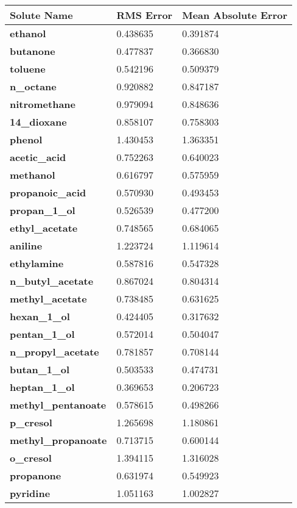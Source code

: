 \documentclass{amsart}
\begin{document}
 
\begin{center}
\begin{tabular}{|l|l|l|} 
\hline  
\textbf{Solute Name}&\textbf{RMS Error}&\textbf{Mean Absolute Error} \\ \hline
\hline 
\textbf{ethanol}&0.438635&0.391874 \\ \hline 
\textbf{butanone}&0.477837&0.366830 \\ \hline 
\textbf{toluene}&0.542196&0.509379 \\ \hline 
\textbf{n\_octane}&0.920882&0.847187 \\ \hline 
\textbf{nitromethane}&0.979094&0.848636 \\ \hline 
\textbf{14\_dioxane}&0.858107&0.758303 \\ \hline 
\textbf{phenol}&1.430453&1.363351 \\ \hline 
\textbf{acetic\_acid}&0.752263&0.640023 \\ \hline 
\textbf{methanol}&0.616797&0.575959 \\ \hline 
\textbf{propanoic\_acid}&0.570930&0.493453 \\ \hline 
\textbf{propan\_1\_ol}&0.526539&0.477200 \\ \hline 
\textbf{ethyl\_acetate}&0.748565&0.684065 \\ \hline 
\textbf{aniline}&1.223724&1.119614 \\ \hline 
\textbf{ethylamine}&0.587816&0.547328 \\ \hline 
\textbf{n\_butyl\_acetate}&0.867024&0.804314 \\ \hline 
\textbf{methyl\_acetate}&0.738485&0.631625 \\ \hline 
\textbf{hexan\_1\_ol}&0.424405&0.317632 \\ \hline 
\textbf{pentan\_1\_ol}&0.572014&0.504047 \\ \hline 
\textbf{n\_propyl\_acetate}&0.781857&0.708144 \\ \hline 
\textbf{butan\_1\_ol}&0.503533&0.474731 \\ \hline 
\textbf{heptan\_1\_ol}&0.369653&0.206723 \\ \hline 
\textbf{methyl\_pentanoate}&0.578615&0.498266 \\ \hline 
\textbf{p\_cresol}&1.265698&1.180861 \\ \hline 
\textbf{methyl\_propanoate}&0.713715&0.600144 \\ \hline 
\textbf{o\_cresol}&1.394115&1.316028 \\ \hline 
\textbf{propanone}&0.631974&0.549923 \\ \hline 
\textbf{pyridine}&1.051163&1.002827 \\ \hline 
\end{tabular} 
\end{center} 
\end{document}
